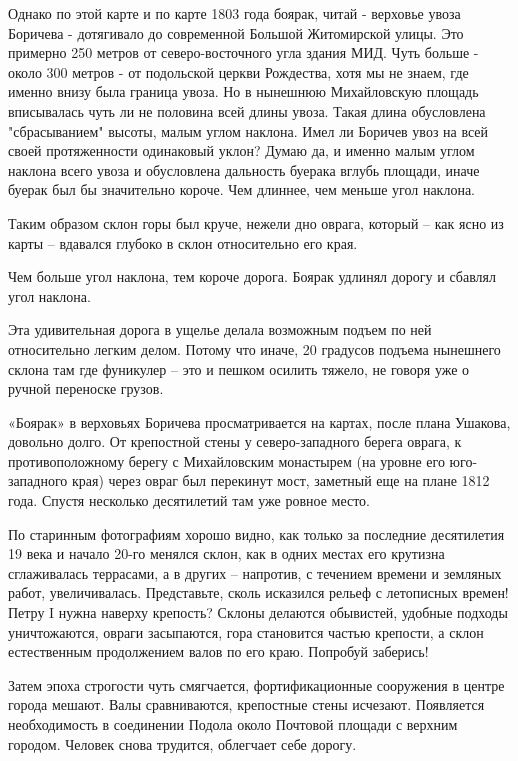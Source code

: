 Однако по этой карте и по карте 1803 года боярак, читай - верховье увоза Боричева - дотягивало до современной Большой Житомирской улицы. Это примерно 250 метров от северо-восточного угла здания МИД. Чуть больше - около 300 метров - от подольской церкви Рождества, хотя мы не знаем, где именно внизу была граница увоза. Но в нынешнюю Михайловскую площадь вписывалась чуть ли не половина всей длины увоза. Такая длина обусловлена "сбрасыванием" высоты, малым углом наклона. Имел ли Боричев увоз на всей своей протяженности одинаковый уклон? Думаю да, и именно малым углом наклона всего увоза и обусловлена дальность буерака вглубь площади, иначе буерак был бы значительно короче. Чем длиннее, чем меньше угол наклона.

Таким образом склон горы был круче, нежели дно оврага, который – как ясно из карты – вдавался глубоко в склон относительно его края. 

Чем больше угол наклона, тем короче дорога. Боярак удлинял дорогу и сбавлял угол наклона. 

Эта удивительная дорога в ущелье делала возможным подъем по ней относительно легким делом. Потому что иначе, 20 градусов подъема нынешнего склона там где фуникулер – это и пешком осилить тяжело, не говоря уже о ручной переноске грузов.


«Боярак» в верховьях Боричева просматривается на картах, после плана Ушакова, довольно долго. От крепостной стены у северо-западного берега оврага, к противоположному берегу с Михайловским монастырем (на уровне его юго-западного края) через овраг был перекинут мост, заметный еще на плане 1812 года. Спустя несколько десятилетий там уже ровное место.

По старинным фотографиям хорошо видно, как только за последние десятилетия 19 века и начало 20-го менялся склон, как в одних местах его крутизна сглаживалась террасами, а в других – напротив, с течением времени и земляных работ, увеличивалась. Представьте, сколь исказился рельеф с летописных времен! Петру I нужна наверху крепость? Склоны делаются обывистей, удобные подходы уничтожаются, овраги засыпаются, гора становится частью крепости, а склон естественным продолжением валов по его краю. Попробуй заберись! 

Затем эпоха строгости чуть смягчается, фортификационные сооружения в центре города мешают. Валы сравниваются, крепостные стены исчезают. Появляется необходимость в соединении Подола около Почтовой площади с верхним городом. Человек снова трудится, облегчает себе дорогу.

